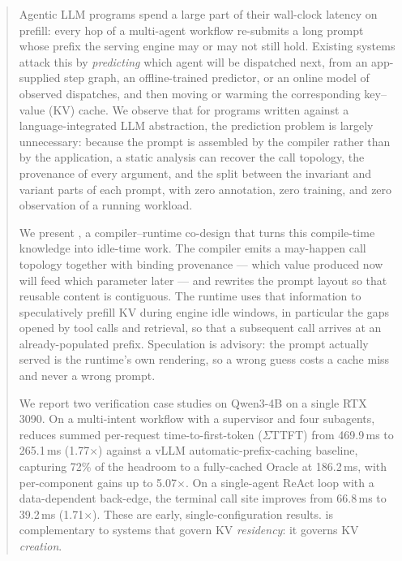 \begin{abstract}
Agentic LLM programs spend a large part of their wall-clock latency on prefill:
every hop of a multi-agent workflow re-submits a long prompt whose prefix the
serving engine may or may not still hold. Existing systems attack this by
\emph{predicting} which agent will be dispatched next, from an app-supplied step
graph, an offline-trained predictor, or an online model of observed dispatches,
and then moving or warming the corresponding key--value (KV) cache. We observe
that for programs written against a language-integrated LLM abstraction, the
prediction problem is largely unnecessary: because the prompt is assembled by the
compiler rather than by the application, a static analysis can recover the call
topology, the provenance of every argument, and the split between the invariant
and variant parts of each prompt, with zero annotation, zero training, and zero
observation of a running workload.

We present \sysname{}, a compiler--runtime co-design that turns this compile-time
knowledge into idle-time work. The compiler emits a may-happen call topology
together with binding provenance --- which value produced now will feed which
parameter later --- and rewrites the prompt layout so that reusable content is
contiguous. The runtime uses that information to speculatively prefill KV during
engine idle windows, in particular the gaps opened by tool calls and retrieval,
so that a subsequent call arrives at an already-populated prefix. Speculation is
advisory: the prompt actually served is the runtime's own rendering, so a wrong
guess costs a cache miss and never a wrong prompt.

We report two verification case studies on Qwen3-4B on a single RTX 3090. On a
multi-intent workflow with a supervisor and four subagents, \sysname{} reduces
summed per-request time-to-first-token (\(\Sigma\)TTFT) from 469.9\,ms to
265.1\,ms (1.77\(\times\)) against a vLLM automatic-prefix-caching baseline,
capturing 72\% of the headroom to a fully-cached Oracle at 186.2\,ms, with
per-component gains up to 5.07\(\times\). On a single-agent ReAct loop with a
data-dependent back-edge, the terminal call site improves from 66.8\,ms to
39.2\,ms (1.71\(\times\)). These are early, single-configuration results.
\sysname{} is complementary to systems that govern KV \emph{residency}: it
governs KV \emph{creation}.
\end{abstract}

